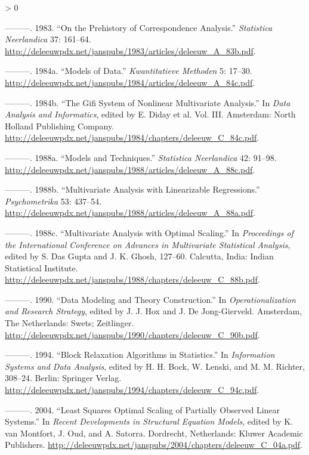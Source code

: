 \documentclass[
  12pt,
]{book}
\newlength{\cslhangindent}
\newenvironment{CSLReferences}[2] %
 {%
  \setlength{\parindent}{0pt}
  \ifodd #1 \everypar{\setlength{\hangindent}{\cslhangindent}}\ignorespaces\fi
  \ifnum #2 > 0
  \setlength{\parskip}{#2\baselineskip}
  \fi
 }%
 {}
\begin{document}
\begin{CSLReferences}{1}{0}
\leavevmode\hypertarget{ref-deleeuw_A_83b}{}%
---------. 1983. {``On the Prehistory of Correspondence Analysis.''} \emph{Statistica Neerlandica} 37: 161--64. \url{http://deleeuwpdx.net/janspubs/1983/articles/deleeuw_A_83b.pdf}.

\leavevmode\hypertarget{ref-deleeuw_A_84c}{}%
---------. 1984a. {``Models of Data.''} \emph{Kwantitatieve Methoden} 5: 17--30. \url{http://deleeuwpdx.net/janspubs/1984/articles/deleeuw_A_84c.pdf}.

\leavevmode\hypertarget{ref-deleeuw_C_84c}{}%
---------. 1984b. {``The Gifi System of Nonlinear Multivariate Analysis.''} In \emph{Data Analysis and Informatics}, edited by E. Diday et al. Vol. III. Amsterdam: North Holland Publishing Company. \url{http://deleeuwpdx.net/janspubs/1984/chapters/deleeuw_C_84c.pdf}.

\leavevmode\hypertarget{ref-deleeuw_A_88c}{}%
---------. 1988a. {``Models and Techniques.''} \emph{Statistica Neerlandica} 42: 91--98. \url{http://deleeuwpdx.net/janspubs/1988/articles/deleeuw_A_88c.pdf}.

\leavevmode\hypertarget{ref-deleeuw_A_88a}{}%
---------. 1988b. {``Multivariate Analysis with Linearizable Regressions.''} \emph{Psychometrika} 53: 437--54. \url{http://deleeuwpdx.net/janspubs/1988/articles/deleeuw_A_88a.pdf}.

\leavevmode\hypertarget{ref-deleeuw_C_88b}{}%
---------. 1988c. {``{Multivariate Analysis with Optimal Scaling}.''} In \emph{Proceedings of the International Conference on Advances in Multivariate Statistical Analysis}, edited by S. Das Gupta and J. K. Ghosh, 127--60. Calcutta, India: Indian Statistical Institute. \url{http://deleeuwpdx.net/janspubs/1988/chapters/deleeuw_C_88b.pdf}.

\leavevmode\hypertarget{ref-deleeuw_C_90b}{}%
---------. 1990. {``Data Modeling and Theory Construction.''} In \emph{Operationalization and Research Strategy}, edited by J. J. Hox and J. De Jong-Gierveld. Amsterdam, The Netherlands: Swets; Zeitlinger. \url{http://deleeuwpdx.net/janspubs/1990/chapters/deleeuw_C_90b.pdf}.

\leavevmode\hypertarget{ref-deleeuw_C_94c}{}%
---------. 1994. {``{Block Relaxation Algorithms in Statistics}.''} In \emph{Information Systems and Data Analysis}, edited by H. H. Bock, W. Lenski, and M. M. Richter, 308--24. Berlin: Springer Verlag. \url{http://deleeuwpdx.net/janspubs/1994/chapters/deleeuw_C_94c.pdf}.

\leavevmode\hypertarget{ref-deleeuw_C_04a}{}%
---------. 2004. {``Least Squares Optimal Scaling of Partially Observed Linear Systems.''} In \emph{Recent Developments in Structural Equation Models}, edited by K. van Montfort, J. Oud, and A. Satorra. Dordrecht, Netherlands: Kluwer Academic Publishers. \url{http://deleeuwpdx.net/janspubs/2004/chapters/deleeuw_C_04a.pdf}.


\end{CSLReferences}
\end{document}

